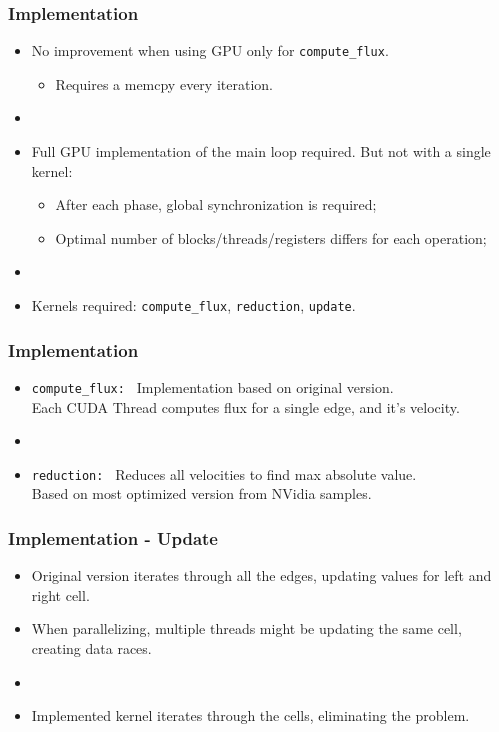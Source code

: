 \documentclass{beamer}
\begin{document}
\begin{frame}
	\frametitle{Implementation}

	\begin{itemize}
		\item[] No improvement when using GPU only for \texttt{compute\_flux}.
		\begin{itemize}
			\item Requires a memcpy every iteration.
		\end{itemize}
		\item[]
		\item[] Full GPU implementation of the main loop required. But not with a single kernel:
		\begin{itemize}
			\item After each phase, global synchronization is required; %
			\item Optimal number of blocks/threads/registers differs for each operation;
		\end{itemize}
		\item[]
		\item[] Kernels required: \texttt{compute\_flux}, \texttt{reduction}, \texttt{update}.
	\end{itemize}
\end{frame}

\begin{frame}
	\frametitle{Implementation}

	\begin{itemize}
		\item \texttt{compute\_flux: } Implementation based on original version. \\
			Each CUDA Thread computes flux for a single edge, and it's velocity.
		\item[]
		\item \texttt{reduction: } Reduces all velocities to find max absolute value. \\
			Based on most optimized version from NVidia samples.
	\end{itemize}
\end{frame}

\begin{frame}
	\frametitle{Implementation - Update}

	\begin{itemize}
		\item[] Original version iterates through all the edges, updating values for left and right cell.
		\item[] When parallelizing, multiple threads might be updating the same cell, creating data races.
		\item[]
		\item[] Implemented kernel iterates through the cells, eliminating the problem.
	\end{itemize}
\end{frame}
\end{document}
